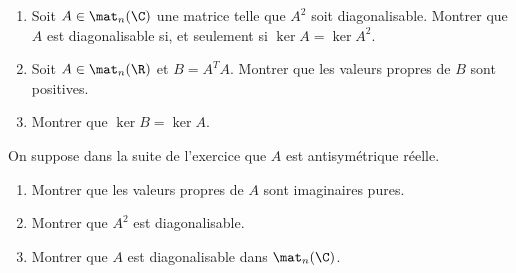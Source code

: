 \begin{enonce}
\begin{exercise}[ID={RMS126 E492},subtitle={Mines-Ponts PSI 2015},tags={}, difficulty={0}]
\begin{enumerate}
  \item Soit $A\in\mat_n(\C)$ une matrice telle que $A^2$ soit diagonalisable.
    Montrer que $A$ est diagonalisable si, et seulement si $\ker A=\ker A^2$.

  \item Soit $A\in\mat_n(\R)$ et $B=A^T A$.
    Montrer que les valeurs propres de $B$ sont positives.

  \item Montrer que $\ker B=\ker A$.
\end{enumerate}
On suppose dans la suite de l'exercice que $A$ est antisymétrique réelle.
\begin{enumerate}[resume]
  \item Montrer que les valeurs propres de $A$ sont imaginaires pures.

  \item Montrer que $A^2$ est diagonalisable.

  \item Montrer que $A$ est diagonalisable dans $\mat_n(\C)$.
\end{enumerate}
\end{exercise}
\begin{solution}
\end{solution}
\end{enonce}
